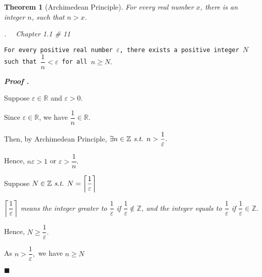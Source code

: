 \documentclass[10pt,letter]{article}
\newcounter{nq}[section]
\newcounter{np}[section]
\newtheorem{thm}{Theorem}[section]
\newenvironment*{p}{\par\noindent\textbf{\textit{Proof \stepcounter{np}\thenp. }}\par}{\par\hfill $\blacksquare$\par}
\newenvironment*{q}[1]{\noindent\emph{\thesection.\stepcounter{nq}\thenq$\quad $ #1}\par\noindent\texttt}{}
\def\Z{{\mathbb{Z}}}
\def\R{{\mathbb{R}}}
\def\st{\emph{ s.t. }}
\begin{document}
\begin{thm}[Archimedean Principle]\label{AP}
	For every real number $x$, there is an integer $n$, such that $n>x$.	
\end{thm}

\begin{framed}\begin{q}
	{Chapter 1.1 \# 11}
	{For every positive real number $\varepsilon$, there exists a positive integer $N$ such that $\dfrac{1}{n}<\varepsilon$ for all $n\geq N.$}
\end{q}\end{framed}
\begin{p}
	Suppose $\varepsilon\in\R$ and $\varepsilon>0.$\marginpar{}\par Since $\varepsilon\in\R$, we have $\dfrac{1}{n}\in\R.$\par Then, by Archimedean Principle, $\exists n\in\Z\st n>\dfrac{1}{\varepsilon}.$\par Hence, $n\varepsilon>1$ or $\varepsilon>\dfrac{1}{n}.$\par Suppose $N\in\Z\st N=\left\lceil\dfrac{1}{\varepsilon}\right\rceil$\par\textit{$\left\lceil\dfrac{1}{\varepsilon}\right\rceil$ means the integer greater to $\dfrac{1}{\varepsilon}$ if $\dfrac{1}{\varepsilon}\notin\Z$, and the integer equals to $\dfrac{1}{\varepsilon}$ if $\dfrac{1}{\varepsilon}\in\Z.$}\par Hence, $N\geq\dfrac{1}{\varepsilon}.$\par As $n>\dfrac{1}{\varepsilon},$ we have $n\geq N$
\end{p}
\end{document}
